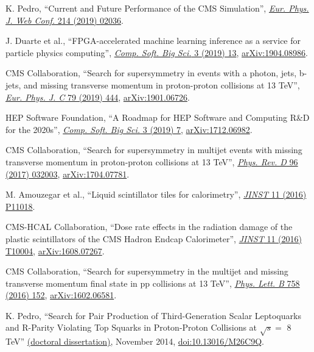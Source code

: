 \begin{description}[leftmargin=12pt,font=\normalfont,labelsep=0em]
\item K. Pedro, ``Current and Future Performance of the CMS Simulation'', \href{https://doi.org/10.1051/epjconf/201921402036}{\emph{Eur. Phys. J. Web Conf.} 214 (2019) 02036}. %
\item \begin{sloppypar}J. Duarte et al., ``FPGA-accelerated machine learning inference as a service for particle physics computing'', \href{https://doi.org/10.1007/s41781-019-0027-2}{\emph{Comp. Soft. Big Sci.} 3 (2019) 13}, \href{https://arxiv.org/abs/1904.08986}{arXiv:1904.08986}.\end{sloppypar} %
\item CMS Collaboration, ``Search for supersymmetry in events with a photon, jets, b-jets, and missing transverse momentum in proton-proton collisions at 13 TeV'', \href{http://dx.doi.org/10.1140/epjc/s10052-019-6926-x}{\emph{Eur. Phys. J. C} 79 (2019) 444}, \href{https://arxiv.org/abs/1901.06726}{arXiv:1901.06726}. %
\item HEP Software Foundation, ``A Roadmap for HEP Software and Computing R\&D for the 2020s'', \href{https://doi.org/10.1007/s41781-018-0018-8}{\emph{Comp. Soft. Big Sci.} 3 (2019) 7}, \href{https://arxiv.org/abs/1712.06982}{arXiv:1712.06982}. %
\item CMS Collaboration, ``Search for supersymmetry in multijet events with missing transverse momentum in proton-proton collisions at 13 TeV'', \href{http://dx.doi.org/10.1103/PhysRevD.96.032003}{\emph{Phys. Rev. D} 96 (2017) 032003}, \href{http://arxiv.org/abs/1704.07781}{arXiv:1704.07781}. %
\item M. Amouzegar et al., ``Liquid scintillator tiles for calorimetry'', \href{http://dx.doi.org/10.1088/1748-0221/11/11/P11018}{\emph{JINST} 11 (2016) P11018}. %
\item CMS-HCAL Collaboration, ``Dose rate effects in the radiation damage of the plastic scintillators of the CMS Hadron Endcap Calorimeter'', \href{http://dx.doi.org/10.1088/1748-0221/11/10/T10004}{\emph{JINST} 11 (2016) T10004}, \href{http://arxiv.org/abs/1608.07267}{arXiv:1608.07267}. %
\item CMS Collaboration, ``Search for supersymmetry in the multijet and missing transverse momentum final state in pp collisions at 13 TeV'', \href{http://dx.doi.org/10.1016/j.physletb.2016.05.002}{\emph{Phys. Lett. B} 758 (2016) 152}, \href{http://arxiv.org/abs/1602.06581}{arXiv:1602.06581}. %
\item K. Pedro, ``Search for Pair Production of Third-Generation Scalar Leptoquarks and R-Parity Violating Top Squarks in Proton-Proton Collisions at $\sqrt{s} =$ 8 TeV'' \href{http://cds.cern.ch/record/1968611}{(doctoral dissertation)}, November 2014, \href{https://doi.org/10.13016/M26C9Q}{doi:10.13016/M26C9Q}. %

\end{description}
